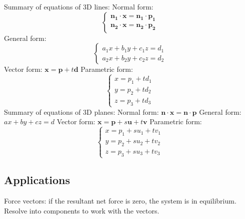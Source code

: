 \documentclass{article}
\begin{document}
\begin{outline}
        \1 Summary of equations of 3D lines:
            \2 Normal form: \[\begin{cases}
                \mathbf{n_1\cdot x=n_1\cdot p_1} \\
                \mathbf{n_2\cdot x=n_2\cdot p_2}
            \end{cases}\]
            \2 General form: \[\begin{cases}
                a_1x+b_1y+c_1z=d_1\\
                a_2x+b_2y+c_2z=d_2
            \end{cases}\]
            \2 Vector form: \(\mathbf{x=p}+t\mathbf d\)
            \2 Parametric form: \[\begin{cases}
                x=p_1+td_1\\
                y=p_2+td_2\\
                z=p_3+td_3
            \end{cases}\]
        \1 Summary of equations of 3D planes: 
            \2 Normal form: \(\mathbf{n\cdot x=n\cdot p}\)
            \2 General form: \(ax+by+cz=d\)
            \2 Vector form: \(\mathbf{x=p}+s\mathbf u+t\mathbf v\)
            \2 Parametric form: \[\begin{cases}
                x=p_1+su_1+tv_1\\
                y=p_2+su_2+tv_2\\
                z=p_3+su_3+tv_3
            \end{cases}\]
    \end{outline}
    \subsection{Applications}
    \begin{outline}
        \1 Force vectors: if the resultant net force is zero, the system is in equilibrium. 
        \1 Resolve into components to work with the vectors. 
    \end{outline}
\end{document}
